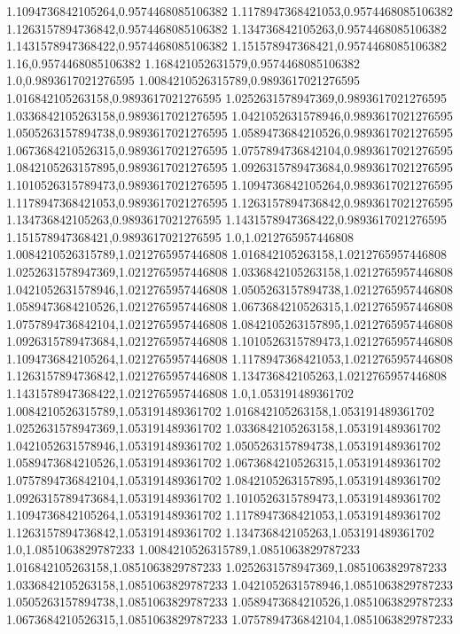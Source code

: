 1.1094736842105264,0.9574468085106382
1.1178947368421053,0.9574468085106382
1.1263157894736842,0.9574468085106382
1.134736842105263,0.9574468085106382
1.1431578947368422,0.9574468085106382
1.151578947368421,0.9574468085106382
1.16,0.9574468085106382
1.168421052631579,0.9574468085106382
1.0,0.9893617021276595
1.0084210526315789,0.9893617021276595
1.016842105263158,0.9893617021276595
1.0252631578947369,0.9893617021276595
1.0336842105263158,0.9893617021276595
1.0421052631578946,0.9893617021276595
1.0505263157894738,0.9893617021276595
1.0589473684210526,0.9893617021276595
1.0673684210526315,0.9893617021276595
1.0757894736842104,0.9893617021276595
1.0842105263157895,0.9893617021276595
1.0926315789473684,0.9893617021276595
1.1010526315789473,0.9893617021276595
1.1094736842105264,0.9893617021276595
1.1178947368421053,0.9893617021276595
1.1263157894736842,0.9893617021276595
1.134736842105263,0.9893617021276595
1.1431578947368422,0.9893617021276595
1.151578947368421,0.9893617021276595
1.0,1.0212765957446808
1.0084210526315789,1.0212765957446808
1.016842105263158,1.0212765957446808
1.0252631578947369,1.0212765957446808
1.0336842105263158,1.0212765957446808
1.0421052631578946,1.0212765957446808
1.0505263157894738,1.0212765957446808
1.0589473684210526,1.0212765957446808
1.0673684210526315,1.0212765957446808
1.0757894736842104,1.0212765957446808
1.0842105263157895,1.0212765957446808
1.0926315789473684,1.0212765957446808
1.1010526315789473,1.0212765957446808
1.1094736842105264,1.0212765957446808
1.1178947368421053,1.0212765957446808
1.1263157894736842,1.0212765957446808
1.134736842105263,1.0212765957446808
1.1431578947368422,1.0212765957446808
1.0,1.053191489361702
1.0084210526315789,1.053191489361702
1.016842105263158,1.053191489361702
1.0252631578947369,1.053191489361702
1.0336842105263158,1.053191489361702
1.0421052631578946,1.053191489361702
1.0505263157894738,1.053191489361702
1.0589473684210526,1.053191489361702
1.0673684210526315,1.053191489361702
1.0757894736842104,1.053191489361702
1.0842105263157895,1.053191489361702
1.0926315789473684,1.053191489361702
1.1010526315789473,1.053191489361702
1.1094736842105264,1.053191489361702
1.1178947368421053,1.053191489361702
1.1263157894736842,1.053191489361702
1.134736842105263,1.053191489361702
1.0,1.0851063829787233
1.0084210526315789,1.0851063829787233
1.016842105263158,1.0851063829787233
1.0252631578947369,1.0851063829787233
1.0336842105263158,1.0851063829787233
1.0421052631578946,1.0851063829787233
1.0505263157894738,1.0851063829787233
1.0589473684210526,1.0851063829787233
1.0673684210526315,1.0851063829787233
1.0757894736842104,1.0851063829787233
